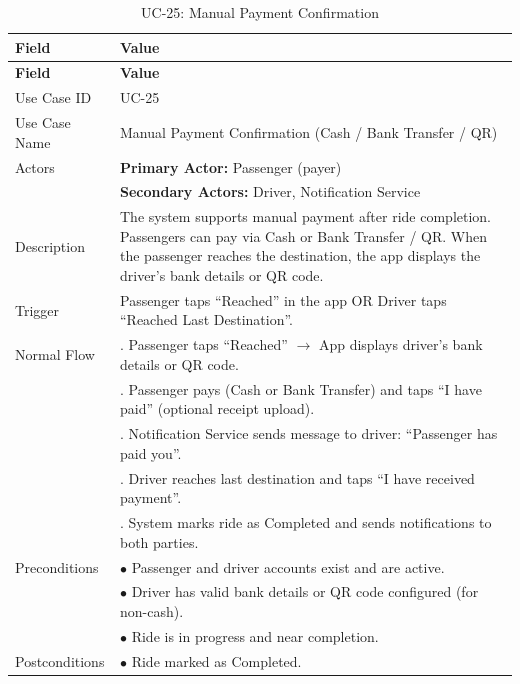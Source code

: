 \begin{longtable}{|>{\raggedright\arraybackslash}p{4cm}|>{\raggedright\arraybackslash}p{11cm}|}
\caption{UC-25: Manual Payment Confirmation}
\label{tab:uc-25} \\
\hline
\rowcolor{lightgray!30}
\textbf{Field} & \textbf{Value} \\
\hline
\endfirsthead
\hline
\rowcolor{lightgray!30}
\textbf{Field} & \textbf{Value} \\
\hline
\endhead
\hline
\endfoot
\hline
\endlastfoot
Use Case ID & UC-25 \\
\hline
Use Case Name & Manual Payment Confirmation (Cash / Bank Transfer / QR) \\
\hline
Actors & \textbf{Primary Actor:} Passenger (payer) \\
& \textbf{Secondary Actors:} Driver, Notification Service \\
\hline
Description & The system supports manual payment after ride completion. Passengers can pay via Cash or Bank Transfer / QR. When the passenger reaches the destination, the app displays the driver's bank details or QR code. \\
\hline
Trigger & Passenger taps ``Reached'' in the app OR Driver taps ``Reached Last Destination''. \\
\hline
Normal Flow & 1. Passenger taps ``Reached'' $\rightarrow$ App displays driver's bank details or QR code. \\
& 2. Passenger pays (Cash or Bank Transfer) and taps ``I have paid'' (optional receipt upload). \\
& 3. Notification Service sends message to driver: ``Passenger has paid you''. \\
& 4. Driver reaches last destination and taps ``I have received payment''. \\
& 5. System marks ride as Completed and sends notifications to both parties. \\
\hline
Preconditions & $\bullet$ Passenger and driver accounts exist and are active. \\
& $\bullet$ Driver has valid bank details or QR code configured (for non-cash). \\
& $\bullet$ Ride is in progress and near completion. \\
\hline
Postconditions & $\bullet$ Ride marked as Completed. \\

\end{longtable}
